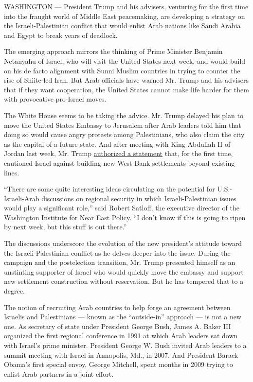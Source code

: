 WASHINGTON --- President Trump and his advisers, venturing for the first
time into the fraught world of Middle East peacemaking, are developing a
strategy on the Israeli-Palestinian conflict that would enlist Arab
nations like Saudi Arabia and Egypt to break years of deadlock.

The emerging approach mirrors the thinking of Prime Minister Benjamin
Netanyahu of Israel, who will visit the United States next week, and
would build on his de facto alignment with Sunni Muslim countries in
trying to counter the rise of Shiite-led Iran. But Arab officials have
warned Mr. Trump and his advisers that if they want cooperation, the
United States cannot make life harder for them with provocative
pro-Israel moves.

The White House seems to be taking the advice. Mr. Trump delayed his
plan to move the United States Embassy to Jerusalem after Arab leaders
told him that doing so would cause angry protests among Palestinians,
who also claim the city as the capital of a future state. And after
meeting with King Abdullah II of Jordan last week, Mr. Trump
\href{https://www.nytimes.com/2017/02/02/world/middleeast/iran-missile-test-trump.html}{authorized
a statement} that, for the first time, cautioned Israel against building
new West Bank settlements beyond existing lines.

``There are some quite interesting ideas circulating on the potential
for U.S.-Israeli-Arab discussions on regional security in which
Israeli-Palestinian issues would play a significant role,'' said Robert
Satloff, the executive director of the Washington Institute for Near
East Policy. ``I don't know if this is going to ripen by next week, but
this stuff is out there.''

The discussions underscore the evolution of the new president's attitude
toward the Israeli-Palestinian conflict as he delves deeper into the
issue. During the campaign and the postelection transition, Mr. Trump
presented himself as an unstinting supporter of Israel who would quickly
move the embassy and support new settlement construction without
reservation. But he has tempered that to a degree.

The notion of recruiting Arab countries to help forge an agreement
between Israelis and Palestinians --- known as the ``outside-in''
approach --- is not a new one. As secretary of state under President
George Bush, James A. Baker III organized the first regional conference
in 1991 at which Arab leaders sat down with Israel's prime minister.
President George W. Bush invited Arab leaders to a summit meeting with
Israel in Annapolis, Md., in 2007. And President Barack Obama's first
special envoy, George Mitchell, spent months in 2009 trying to enlist
Arab partners in a joint effort.

